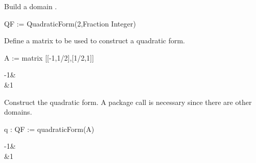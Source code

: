 {{{{\vskip 2pc
\begin{xtc}
\begin{xtccomment}
Build a domain .
\end{xtccomment}
\begin{spadsrc}
QF := QuadraticForm(2,Fraction Integer)
\end{spadsrc}
\begin{TeXOutput}
\begin{fricasmath}{1}
%
\end{fricasmath}
\end{TeXOutput}
\end{xtc}
\begin{xtc}
\begin{xtccomment}
Define a matrix to be used to construct
a quadratic form.
\end{xtccomment}
\begin{spadsrc}
A := matrix [[-1,1/2],[1/2,1]]
\end{spadsrc}
\begin{TeXOutput}
\begin{fricasmath}{2}
\begin{MATRIX}{2}-{1}&\\&1\end{MATRIX}%
\end{fricasmath}
\end{TeXOutput}
\end{xtc}
\begin{xtc}
\begin{xtccomment}
Construct the quadratic form.
A package call  is necessary since there
are other  domains.
\end{xtccomment}
\begin{spadsrc}
q : QF := quadraticForm(A)
\end{spadsrc}
\begin{TeXOutput}
\begin{fricasmath}{3}
\begin{MATRIX}{2}-{1}&\\&1\end{MATRIX}%
\end{fricasmath}
\end{TeXOutput}
\end{xtc}
\begin{xtc}
\begin{xtccomment}

\end{xtccomment}
\end{xtc}}}}}
